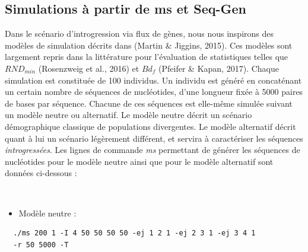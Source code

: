 \documentclass[12pt,twoside]{reedthesis}
\providecommand{\tightlist}{%
  \setlength{\itemsep}{0pt}\setlength{\parskip}{0pt}}
\begin{document}
  \newpage
  
  \subsection{Simulations à partir de ms et
  Seq-Gen}\label{simulations-a-partir-de-ms-et-seq-gen}
  
  Dans le scénario d'introgression via flux de gènes, nous nous inspirons
  des modèles de simulation décrits dans (Martin \& Jiggins, 2015). Ces
  modèles sont largement repris dans la littérature pour l'évaluation de
  statistiques telles que \(RND_{min}\) (Rosenzweig et al., 2016) et
  \(Bd_f\) (Pfeifer \& Kapan, 2017). Chaque simulation est constituée de
  100 individus. Un individu est généré en concaténant un certain nombre
  de séquences de nucléotides, d'une longueur fixée à 5000 paires de bases
  par séquence. Chacune de ces séquences est elle-même simulée suivant un
  modèle neutre ou alternatif. Le modèle neutre décrit un scénario
  démographique classique de populations divergentes. Le modèle alternatif
  décrit quant à lui un scénario légèrement différent, et servira à
  caractériser les séquences \emph{introgressées}. Les lignes de commande
  \emph{ms} permettant de générer les séquences de nucléotides pour le
  modèle neutre ainsi que pour le modèle alternatif sont données
  ci-dessous :
  
  ~
  
  \begin{itemize}
  \tightlist
  \item
    Modèle neutre :
  \end{itemize}
  
  \begin{verbatim}
  ./ms 200 1 -I 4 50 50 50 50 -ej 1 2 1 -ej 2 3 1 -ej 3 4 1 
  -r 50 5000 -T 
  \end{verbatim}
  
\end{document}
